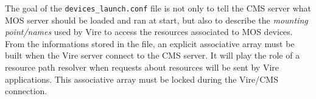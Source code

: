 The goal of the \texttt{devices\_launch.conf} file is not only to tell
the CMS server what MOS server should  be loaded and ran at start, but
also  to describe  the  \emph{mounting point/names}  used  by Vire  to
access the resources associated to MOS devices.  From the informations
stored in the  file, an explicit associative array must  be built when
the Vire server connect to the CMS server.  It will play the role of a
resource path resolver  when requests about resources will  be sent by
Vire applications.  This associative array  must be locked  during the
Vire/CMS connection.











\vfill
\pagebreak
\clearpage

